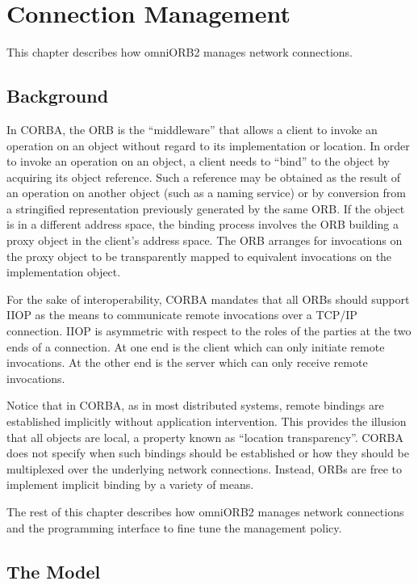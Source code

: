 \documentclass[11pt,twoside,onecolumn]{book}
\begin{document}
\chapter{Connection Management}
\label{ch_conn}


This chapter describes how omniORB2 manages network connections.

\section{Background}

In CORBA, the ORB is the ``middleware'' that allows a client to invoke an
operation on an object without regard to its implementation or location. In
order to invoke an operation on an object, a client needs to ``bind'' to
the object by acquiring its object reference. Such a reference may be
obtained as the result of an operation on another object (such as a naming
service) or by conversion from a stringified representation previously
generated by the same ORB. If the object is in a different address space,
the binding process involves the ORB building a proxy object in the
client's address space. The ORB arranges for invocations on the proxy
object to be transparently mapped to equivalent invocations on the
implementation object.

For the sake of interoperability, CORBA mandates that all ORBs should
support IIOP as the means to communicate remote invocations over a TCP/IP
connection. IIOP is asymmetric with respect to the roles of the parties at
the two ends of a connection. At one end is the client which can only
initiate remote invocations. At the other end is the server which can only
receive remote invocations.

Notice that in CORBA, as in most distributed systems, remote bindings are
established implicitly without application intervention. This provides the
illusion that all objects are local, a property known as ``location
transparency''. CORBA does not specify when such bindings should be
established or how they should be multiplexed over the underlying network
connections. Instead, ORBs are free to implement implicit binding by a
variety of means. 

The rest of this chapter describes how omniORB2 manages network
connections and the programming interface to fine tune the management
policy. 

\section{The Model}
\end{document}
